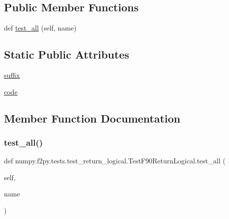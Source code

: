 \subsection*{Public Member Functions}
\begin{DoxyCompactItemize}
\item 
def \hyperlink{classnumpy_1_1f2py_1_1tests_1_1test__return__logical_1_1TestF90ReturnLogical_a0ba90995e347e9e480c06fc9a4794a1d}{test\+\_\+all} (self, name)
\end{DoxyCompactItemize}
\subsection*{Static Public Attributes}
\begin{DoxyCompactItemize}
\item 
\hyperlink{classnumpy_1_1f2py_1_1tests_1_1test__return__logical_1_1TestF90ReturnLogical_af3c54740961f449195b115aa4cb3a7c0}{suffix}
\item 
\hyperlink{classnumpy_1_1f2py_1_1tests_1_1test__return__logical_1_1TestF90ReturnLogical_ac925c6388206b1f57f1042f689578e7d}{code}
\end{DoxyCompactItemize}


\subsection{Member Function Documentation}
\mbox{\label{classnumpy_1_1f2py_1_1tests_1_1test__return__logical_1_1TestF90ReturnLogical_a0ba90995e347e9e480c06fc9a4794a1d}} 
\subsubsection{\texorpdfstring{test\+\_\+all()}{test\_all()}}
{\footnotesize\ttfamily def numpy.\+f2py.\+tests.\+test\+\_\+return\+\_\+logical.\+Test\+F90\+Return\+Logical.\+test\+\_\+all (\begin{DoxyParamCaption}\item[{}]{self,  }\item[{}]{name }\end{DoxyParamCaption})}



